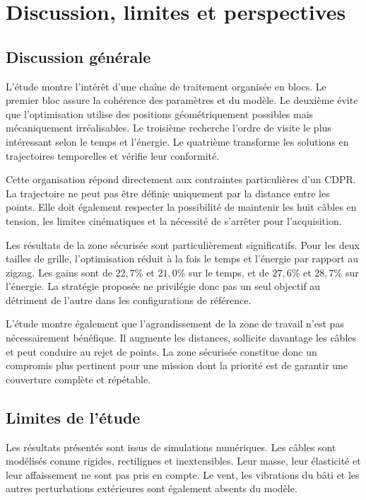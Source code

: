 \section{Discussion, limites et perspectives}
\label{sec:discussion_perspectives_nouveau}

\subsection{Discussion générale}

L'étude montre l'intérêt d'une chaîne de traitement organisée en blocs. Le premier bloc assure la cohérence des paramètres et du modèle. Le deuxième évite que l'optimisation utilise des positions géométriquement possibles mais mécaniquement irréalisables. Le troisième recherche l'ordre de visite le plus intéressant selon le temps et l'énergie. Le quatrième transforme les solutions en trajectoires temporelles et vérifie leur conformité.

Cette organisation répond directement aux contraintes particulières d'un CDPR. La trajectoire ne peut pas être définie uniquement par la distance entre les points. Elle doit également respecter la possibilité de maintenir les huit câbles en tension, les limites cinématiques et la nécessité de s'arrêter pour l'acquisition.

Les résultats de la zone sécurisée sont particulièrement significatifs. Pour les deux tailles de grille, l'optimisation réduit à la fois le temps et l'énergie par rapport au zigzag. Les gains sont de $22{,}7\%$ et $21{,}0\%$ sur le temps, et de $27{,}6\%$ et $28{,}7\%$ sur l'énergie. La stratégie proposée ne privilégie donc pas un seul objectif au détriment de l'autre dans les configurations de référence.

L'étude montre également que l'agrandissement de la zone de travail n'est pas nécessairement bénéfique. Il augmente les distances, sollicite davantage les câbles et peut conduire au rejet de points. La zone sécurisée constitue donc un compromis plus pertinent pour une mission dont la priorité est de garantir une couverture complète et répétable.

\subsection{Limites de l'étude}

Les résultats présentés sont issus de simulations numériques. Les câbles sont modélisés comme rigides, rectilignes et inextensibles. Leur masse, leur élasticité et leur affaissement ne sont pas pris en compte. Le vent, les vibrations du bâti et les autres perturbations extérieures sont également absents du modèle.


